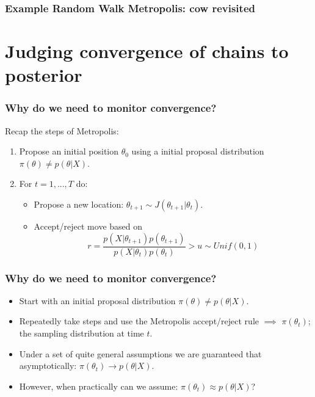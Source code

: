 \documentclass[handout]{beamer}
\begin{document}
\begin{frame}
	\frametitle{Example Random Walk Metropolis: cow revisited}
	
	\begin{figure}[t]
		\centerline{}
	\end{figure}
	
\end{frame}

\section{Judging convergence of chains to posterior}
\frame{\tableofcontents[currentsection]}


\begin{frame}
\frametitle{Why do we need to monitor convergence?}
Recap the steps of Metropolis:
\begin{enumerate}
\item<2-> Propose an initial position $\theta_0$ using a initial proposal distribution $\pi(\theta)\neq p(\theta|X)$.
\item<3-> For $t=1,...,T$ do:
\begin{itemize}
\item<4-> Propose a new location:
 $\theta_{t+1}\sim J(\theta_{t+1}|\theta_t)$.
\item<5-> Accept/reject move based on
\begin{equation}
r = \frac{p(X|\theta_{t+1}) p(\theta_{t+1})}{p(X|\theta_{t}) p(\theta_{t})} > u\sim Unif(0,1)
\end{equation}
\end{itemize}
\end{enumerate}

\end{frame}


\begin{frame}
\frametitle{Why do we need to monitor convergence?}
\begin{itemize}
\item<2-> Start with an initial proposal distribution $\pi(\theta)\neq p(\theta|X)$.
\item<3-> Repeatedly take steps and use the Metropolis accept/reject rule $\implies$ $\pi(\theta_t)$; the sampling distribution at time $t$.
\item<4-> Under a set of quite general assumptions we are guaranteed that asymptotically: $\pi(\theta_t)\rightarrow p(\theta|X)$.
\item<5-> However, when practically can we assume: $\pi(\theta_t)\approx p(\theta|X)$?
\end{itemize}
\end{frame}
\end{document}
